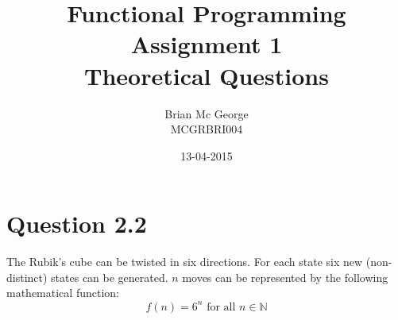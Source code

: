 \documentclass[]{article}
\title{Functional Programming Assignment 1\\Theoretical Questions}
\date{13-04-2015}
\author{Brian Mc George\\MCGRBRI004
}
\begin{document}
\maketitle
\newpage
\section{Question 2.2}
The Rubik's cube can be twisted in six directions. For each state six new (non-distinct) states can be generated. \(n\) moves can be represented by the following mathematical function:\[f(n)=6^n\text{ for all }n \in\mathbb{N}\]
\end{document}
